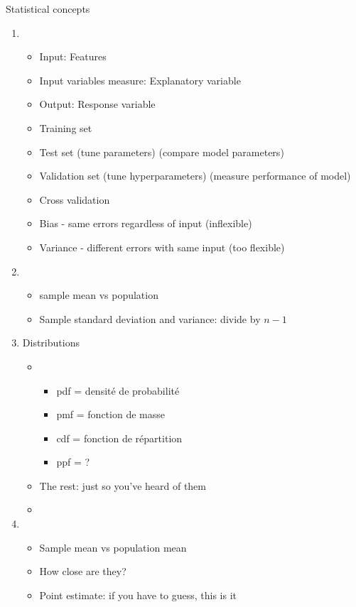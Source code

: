 Statistical concepts
\begin{enumerate}
\item {}
  \begin{itemize}
  \item Input:  Features
  \item Input variables measure:  Explanatory variable
  \item Output: Response variable
  \item Training set
  \item Test set (tune parameters) (compare model parameters)
  \item Validation set (tune hyperparameters) (measure performance of model)
  \item Cross validation
  \item Bias - same errors regardless of input (inflexible)
  \item Variance - different errors with same input (too flexible)
  \end{itemize}
\item {}
  \begin{itemize}
  \item sample mean vs population 
  \item Sample standard deviation and variance: divide by $n-1$
  \end{itemize}
\item Distributions
  \begin{itemize}
  \item {}
    \begin{itemize}
    \item pdf = densité de probabilité
    \item pmf = fonction de masse
    \item cdf = fonction de répartition
    \item ppf = ?
    \end{itemize}
  \item The rest: just so you've heard of them
  \item {}
  \end{itemize}
\item {}
  \begin{itemize}
  \item Sample mean vs population mean
  \item How close are they?
  \item Point estimate: if you have to guess, this is it

\end{itemize}
\end{enumerate}
